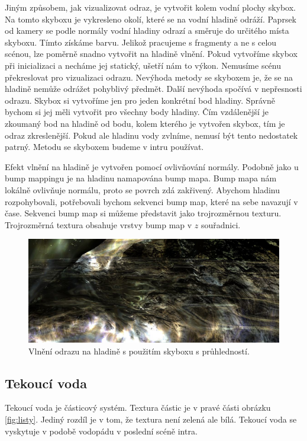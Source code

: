 Jiným způsobem, jak vizualizovat odraz, je vytvořit kolem vodní plochy skybox.
Na tomto skyboxu je vykresleno okolí, které se na vodní hladině odráží.
Paprsek od kamery se podle normály vodní hladiny odrazí a směruje do určitého místa skyboxu.
Tímto získáme barvu.
Jelikož pracujeme s fragmenty a ne s celou scénou, lze poměrně snadno vytvořit na hladině vlnění.
Pokud vytvoříme skybox při inicializaci a necháme jej statický, ušetří nám to výkon.
Nemusíme scénu překreslovat pro vizualizaci odrazu.
Nevýhoda metody se skyboxem je, že se na hladině nemůže odrážet pohyblivý předmět.
Další nevýhoda spočívá v nepřesnosti odrazu.
Skybox si vytvoříme jen pro jeden konkrétní bod hladiny.
Správně bychom si jej měli vytvořit pro všechny body hladiny.
Čím vzdálenější je zkoumaný bod na hladině od bodu, kolem kterého je vytvořen skybox, tím je odraz zkreslenější.
Pokud ale hladinu vody zvlníme, nemusí být tento nedostatek patrný.
Metodu se skyboxem budeme v intru používat.

Efekt vlnění na hladině je vytvořen pomocí ovlivňování normály.
Podobně jako u bump mappingu je na hladinu namapována bump mapa.
Bump mapa nám lokálně ovlivňuje normálu, proto se povrch zdá zakřivený.
Abychom hladinu rozpohybovali, potřebovali bychom sekvenci bump map, které na sebe navazují v čase.
Sekvenci bump map si můžeme představit jako trojrozměrnou texturu.
Trojrozměrná textura obsahuje vrstvy bump map v $z$ souřadnici.
\begin{figure}[h]
\centering
\includegraphics[width=15cm,keepaspectratio]{obr/reflex1.jpg}
\caption{Vlnění odrazu na hladině s použitím skyboxu s průhledností.}
\label{fig:reflex1}
\end{figure}


\subsection{Tekoucí voda}
Tekoucí voda je částicový systém.
Textura částic je v pravé části obrázku \ref{fig:listy}.
Jediný rozdíl je v tom, že textura není zelená ale bílá.
Tekoucí voda se vyskytuje v podobě vodopádu v poslední scéně intra.
